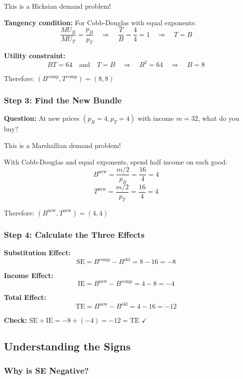 \documentclass[11pt]{article}
\begin{document}
This is a Hicksian demand problem!

\textbf{Tangency condition:} For Cobb-Douglas with equal exponents:
$$\frac{MU_B}{MU_T} = \frac{p_B}{p_T} \quad \Rightarrow \quad \frac{T}{B} = \frac{4}{4} = 1 \quad \Rightarrow \quad T = B$$

\textbf{Utility constraint:}
$$BT = 64 \quad \text{and} \quad T = B \quad \Rightarrow \quad B^2 = 64 \quad \Rightarrow \quad B = 8$$

Therefore: $\boxed{(B^{\text{comp}}, T^{\text{comp}}) = (8, 8)}$

\subsubsection{Step 3: Find the New Bundle}

\textbf{Question:} At new prices $(p_B=4, p_T=4)$ with income $m=32$, what do you buy?

This is a Marshallian demand problem!

With Cobb-Douglas and equal exponents, spend half income on each good:
$$B^{\text{new}} = \frac{m/2}{p_B} = \frac{16}{4} = 4$$
$$T^{\text{new}} = \frac{m/2}{p_T} = \frac{16}{4} = 4$$

Therefore: $\boxed{(B^{\text{new}}, T^{\text{new}}) = (4, 4)}$

\subsubsection{Step 4: Calculate the Three Effects}

\textbf{Substitution Effect:}
$$\text{SE} = B^{\text{comp}} - B^{\text{old}} = 8 - 16 = \boxed{-8}$$

\textbf{Income Effect:}
$$\text{IE} = B^{\text{new}} - B^{\text{comp}} = 4 - 8 = \boxed{-4}$$

\textbf{Total Effect:}
$$\text{TE} = B^{\text{new}} - B^{\text{old}} = 4 - 16 = \boxed{-12}$$

\textbf{Check:} $\text{SE} + \text{IE} = -8 + (-4) = -12 = \text{TE}$ $\checkmark$

\newpage

\subsection{Understanding the Signs}

\subsubsection{Why is SE Negative?}
\end{document}
